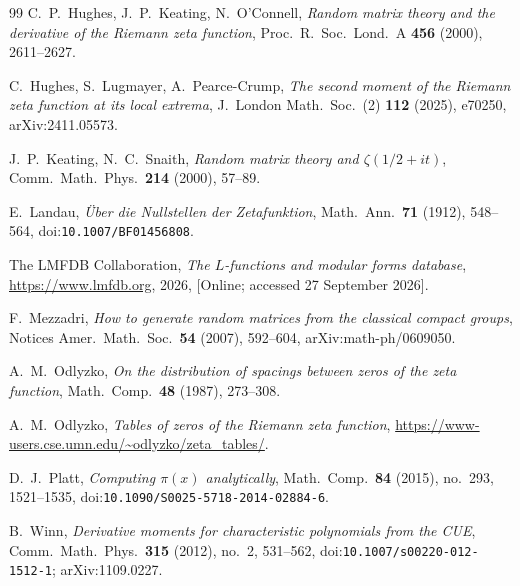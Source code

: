 \documentclass[12pt]{amsart}
\theoremstyle{remark}
\newcommand{\1}{\mathbf{1}}
\begin{document}
\begin{thebibliography}{99}
 C.~P.~Hughes, J.~P.~Keating, N.~O'Connell, \emph{Random
matrix theory and the derivative of the Riemann zeta function},
Proc.\ R.\ Soc.\ Lond.\ A \textbf{456} (2000), 2611--2627.

 C.~Hughes, S.~Lugmayer, A.~Pearce-Crump, \emph{The second
moment of the Riemann zeta function at its local extrema}, J.\ London
Math.\ Soc.\ (2) \textbf{112} (2025), e70250, arXiv:2411.05573.

 J.~P.~Keating, N.~C.~Snaith, \emph{Random matrix theory and
$\zeta(1/2+it)$}, Comm.\ Math.\ Phys.\ \textbf{214} (2000), 57--89.

 E.~Landau, \emph{\"Uber die Nullstellen der
Zetafunktion}, Math.\ Ann.\ \textbf{71} (1912), 548--564,
doi:\nolinkurl{10.1007/BF01456808}.

 The LMFDB Collaboration, \emph{The $L$-functions and modular
forms database}, \url{https://www.lmfdb.org}, 2026, [Online; accessed
27 September 2026].

 F.~Mezzadri, \emph{How to generate random matrices from the
classical compact groups}, Notices Amer.\ Math.\ Soc.\ \textbf{54} (2007),
592--604, arXiv:math-ph/0609050.

 A.~M.~Odlyzko, \emph{On the distribution of spacings
between zeros of the zeta function}, Math.\ Comp.\ \textbf{48} (1987),
273--308.

 A.~M.~Odlyzko, \emph{Tables of zeros of the Riemann
zeta function}, \url{https://www-users.cse.umn.edu/~odlyzko/zeta_tables/}.

 D.~J.~Platt, \emph{Computing $\pi(x)$ analytically},
Math.\ Comp.\ \textbf{84} (2015), no.~293, 1521--1535,
doi:\nolinkurl{10.1090/S0025-5718-2014-02884-6}.

 B.~Winn, \emph{Derivative moments for characteristic
polynomials from the CUE}, Comm.\ Math.\ Phys.\ \textbf{315} (2012),
no.~2, 531--562, doi:\nolinkurl{10.1007/s00220-012-1512-1}; arXiv:1109.0227.

\end{thebibliography}
\end{document}
